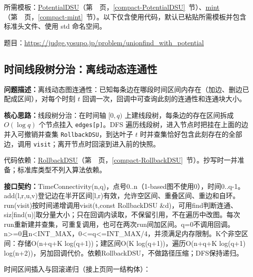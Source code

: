 所需模板：\hyperref[compact-PotentialDSU]{PotentialDSU}（第~\pageref{compact-PotentialDSU}~页，\ref{compact-PotentialDSU}~节）、\hyperref[compact-mint]{mint}（第~\pageref{compact-mint}~页，\ref{compact-mint}~节）。以下仅含使用代码，默认已粘贴所需模板并包含标准头文件、使用 std 命名空间。

题目：\url{https://judge.yosupo.jp/problem/unionfind_with_potential}



\subsection{时间线段树分治：离线动态连通性}\label{compact-TimeConnectivity}

\noindent\textbf{问题描述：}\allowbreak 离线动态图连通性：已知每条边在哪段时间区间内存在（加边、删边已配成区间），对每个时刻 $t$ 回调一次，回调中可查询此刻的连通性和连通块大小。

\textbf{核心思路：}\allowbreak 线段树分治：在时间轴 $[0,q)$ 上建线段树，每条边的存在区间拆成 $O(\log q)$ 个节点挂入 \texttt{edges[p]}。DFS 遍历线段树，进入节点时把挂在上面的边并入可撤销并查集 \texttt{RollbackDSU}，到达叶子 $t$ 时并查集恰好包含此刻存在的全部边，调用 \texttt{visit}；离开节点时回滚到进入前的快照。

代码依赖：\hyperref[compact-RollbackDSU]{RollbackDSU}（第~\pageref{compact-RollbackDSU}~页，\ref{compact-RollbackDSU}~节）。抄写时一并准备；标准库类型不列入算法依赖。

{\sloppy{}\noindent\textbf{接口契约：}TimeConnectivity(n,q)，点号0..n（1-based图不使用0），时间0..q-1。add(l,r,u,v)登记边在半开区间[l,r)有效，允许空区间、重叠区间、重边和自环。run(visit)按时间递增调用visit(t,const RollbackDSU \&d)，可用find判断连通、siz[find(u)]取分量大小；只在回调内读取，不保留引用，不在遍历中改图。每次run重新建并查集，可重复调用，也可在两次run间加区间。q=0不调用回调。n>=0且n<INT\_MAX，0<=q<=INT\_MAX/4，并须满足内存限制。K个非空区间：存储O(n+q+K log(q+1))；建区间O(K log(q+1))，遍历O(n+q+K log(q+1) log(n+2))，另加回调代价。依赖RollbackDSU，不做路径压缩；DFS保持递归。\par}



\newpage

\noindent 时间区间插入与回滚递归（接上页同一结构体）：



